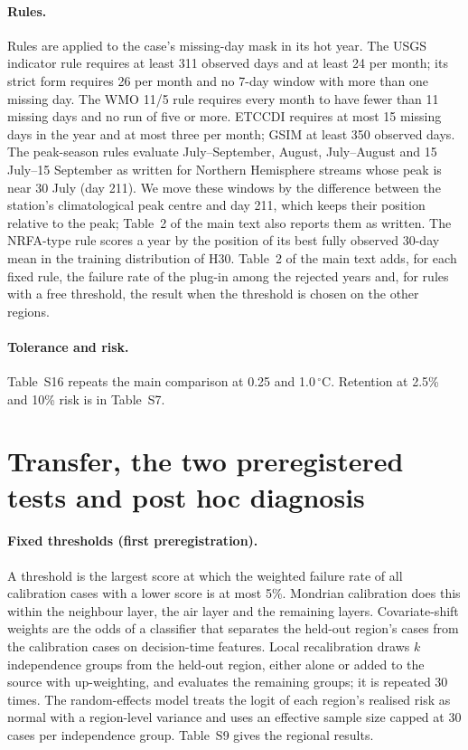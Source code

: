 \documentclass[draft]{agujournal2025}
\begin{document}
\paragraph{Rules.} Rules are applied to the case's missing-day mask in its hot year. The USGS indicator rule requires at least 311 observed days and at least 24 per month; its strict form requires 26 per month and no 7-day window with more than one missing day. The WMO 11/5 rule requires every month to have fewer than 11 missing days and no run of five or more. ETCCDI requires at most 15 missing days in the year and at most three per month; GSIM at least 350 observed days. The peak-season rules evaluate July--September, August, July--August and 15 July--15 September as written for Northern Hemisphere streams whose peak is near 30 July (day 211). We move these windows by the difference between the station's climatological peak centre and day 211, which keeps their position relative to the peak; Table~2 of the main text also reports them as written. The NRFA-type rule scores a year by the position of its best fully observed 30-day mean in the training distribution of H30. Table~2 of the main text adds, for each fixed rule, the failure rate of the plug-in among the rejected years and, for rules with a free threshold, the result when the threshold is chosen on the other regions.

\paragraph{Tolerance and risk.} Table~S16 repeats the main comparison at 0.25 and 1.0\,$^{\circ}$C. Retention at 2.5\% and 10\% risk is in Table~S7.

\section{Transfer, the two preregistered tests and post hoc diagnosis}
\paragraph{Fixed thresholds (first preregistration).} A threshold is the largest score at which the weighted failure rate of all calibration cases with a lower score is at most 5\%. Mondrian calibration does this within the neighbour layer, the air layer and the remaining layers. Covariate-shift weights are the odds of a classifier that separates the held-out region's cases from the calibration cases on decision-time features. Local recalibration draws $k$ independence groups from the held-out region, either alone or added to the source with up-weighting, and evaluates the remaining groups; it is repeated 30 times. The random-effects model treats the logit of each region's realised risk as normal with a region-level variance and uses an effective sample size capped at 30 cases per independence group. Table~S9 gives the regional results.
\end{document}
